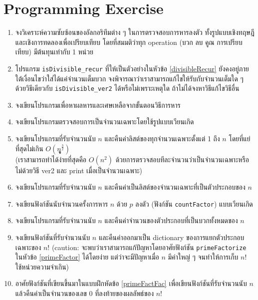 \newpage
\section{Programming Exercise}
\begin{enumerate}
	\item จงวิเคราะห์ความซับซ้อนของอัลกอริทึมต่าง ๆ ในการตรวจสอบการหารลงตัว ทั้งรูปแบบเชิงทฤษฎี และเชิงการทดลองเพื่อเปรียบเทียบ โดยที่สมมติว่าทุก operation (บวก ลบ คูณ การเปรียบเทียบ) มีต้นทุนเท่ากับ 1 หน่วย
	\item โปรแกรม \texttt{isDivisible\_recur} ที่ให้เป็นตัวอย่างในหัวข้อ \ref{divisibleRecur} ยังคงอยู่ภายใต้เงื่อนไขว่าใส่ได้แค่จำนวนเต็มบวก จงพิจารณาว่าเราสามารถแก้ไขให้รับกับจำนวนเต็มใด ๆ ด้วยวิธีเดียวกับ \texttt{isDivisible\_ver2} ได้หรือไม่เพราะเหตุใด ถ้าไม่ได้จงหาวิธีแก้ไขวิธีอื่น
	\item จงเขียนโปรแกรมเพื่อหาผลหารและเศษเหลือจากขั้นตอนวิธีการหาร
	\item จงเขียนโปรแกรมตรวจสอบการเป็นจำนวนเฉพาะโดยใช้รูปแบบเวียนเกิด
	\item จงเขียนโปรแกรมที่รับจำนวนนับ $n$ และคืนค่าลิสต์ของทุกจำนวนเฉพาะตั้งแต่ 1 ถึง $n$ โดยที่แย่ที่สุดไม่เกิน $O(nูู^\frac{3}{2})$\\
	(เราสามารถทำได้ง่ายที่สุดคือ $O(n^2)$ ด้วยการตรวจสอบทีละจำนวนว่าเป็นจำนวนเฉพาะหรือไม่ด้วยวิธี ver2 และ print เมื่อเป็นจำนวนเฉพาะ)
	\item \label{allPrimeFactor} จงเขียนโปรแกรมที่รับจำนวนนับ $n$ และคืนค่าเป็นลิสต์ของจำนวนเฉพาะที่เป็นตัวประกอบของ $n$ 
	\item จงเขียนฟังก์ชันนับจำนวนครั้งการหาร $n$ ด้วย $p$ ลงตัว (ฟังก์ชัน \texttt{countFactor}) แบบเวียนเกิด 
	\item จงเขียนโปรแกรมที่รับจำนวนนับ $n$ และคืนค่าจำนวนของตัวประกอบที่เป็นบวกทั้งหมดของ $n$
	\item \label{primeFactFac} จงเขียนฟังก์ชันที่รับจำนวนนับ $n$ และคืนค่าออกมาเป็น dictionary ของการแยกตัวประกอบเฉพาะของ $n!$ (caution: จะพบว่าเราสามารถแก้ปัญหาโดยอาศัยฟังก์ชัน \texttt{primeFactorize} ในหัวข้อ \ref{primeFactor} ได้โดยง่าย แต่ว่าจะมีปัญหาเมื่อ $n$ มีค่าใหญ่ ๆ จนทำให้การเก็บ $n!$ ใช้หน่วยความจำเกิน)
	\item อาศัยฟังก์ชันที่เขียนขึ้นมาในแบบฝึกหัดข้อ \ref{primeFactFac} เพื่อเขียนฟังก์ชันที่รับจำนวนนับ $n$ แล้วคืนค่าเป็นจำนวนของเลข 0 ที่ลงท้ายของผลลัพธ์ของ $n!$
\end{enumerate}
